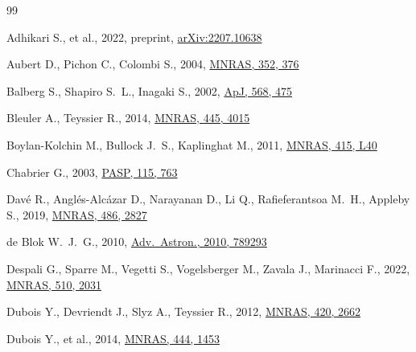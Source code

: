 \documentclass[fleqn,usenatbib]{mnras}
\begin{document}
\begin{thebibliography}{99}

Adhikari S., et al., 2022, preprint,
\href{https://arxiv.org/abs/2207.10638}{arXiv:2207.10638}

Aubert D., Pichon C., Colombi S., 2004, \href{https://doi.org/10.1111/j.1365-2966.2004.07883.x}{MNRAS, 352, 376}

Balberg S., Shapiro S.~L., Inagaki S., 2002, \href{https://doi.org/10.1086/339038}{ApJ, 568, 475}

Bleuler A., Teyssier R., 2014, \href{https://doi.org/10.1093/mnras/stu2005}{MNRAS, 445, 4015}

Boylan-Kolchin M., Bullock J.~S., Kaplinghat M., 2011, \href{https://doi.org/10.1111/j.1745-3933.2011.01074.x}{MNRAS, 415, L40}

Chabrier G., 2003, \href{https://doi.org/10.1086/376392}{PASP, 115, 763}

Dav{\'e} R., Angl{\'e}s-Alc{\'a}zar D., Narayanan D., Li Q., Rafieferantsoa M.~H., Appleby S., 2019, \href{https://doi.org/10.1093/mnras/stz937}{MNRAS, 486, 2827}

de Blok W.~J.~G., 2010, \href{https://doi.org/10.1155/2010/789293}{Adv.\ Astron., 2010, 789293}

Despali G., Sparre M., Vegetti S., Vogelsberger M., Zavala J., Marinacci F., 2022, \href{https://doi.org/10.1093/mnras/stab3537}{MNRAS, 510, 2031}

Dubois Y., Devriendt J., Slyz A., Teyssier R., 2012, \href{https://doi.org/10.1111/j.1365-2966.2011.20236.x}{MNRAS, 420, 2662}

Dubois Y., et al., 2014, \href{https://doi.org/10.1093/mnras/stu1227}{MNRAS, 444, 1453}


\end{thebibliography}
\end{document}
